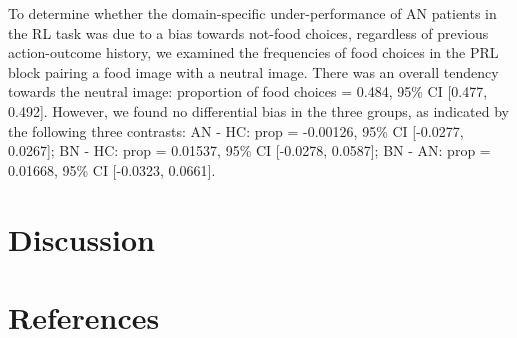 \documentclass[
  man,floatsintext]{apa6}
\begin{document}
To determine whether the domain-specific under-performance of AN patients in the RL task was due to a bias towards not-food choices, regardless of previous action-outcome history, we examined the frequencies of food choices in the PRL block pairing a food image with a neutral image. There was an overall tendency towards the neutral image: proportion of food choices = 0.484, 95\% CI {[}0.477, 0.492{]}. However, we found no differential bias in the three groups, as indicated by the following three contrasts: AN - HC: prop = -0.00126, 95\% CI {[}-0.0277, 0.0267{]}; BN - HC: prop = 0.01537, 95\% CI {[}-0.0278, 0.0587{]}; BN - AN: prop = 0.01668, 95\% CI {[}-0.0323, 0.0661{]}.

\hypertarget{discussion}{%
\section{Discussion}\label{discussion}}

\newpage

\hypertarget{references}{%
\section{References}\label{references}}
\end{document}
